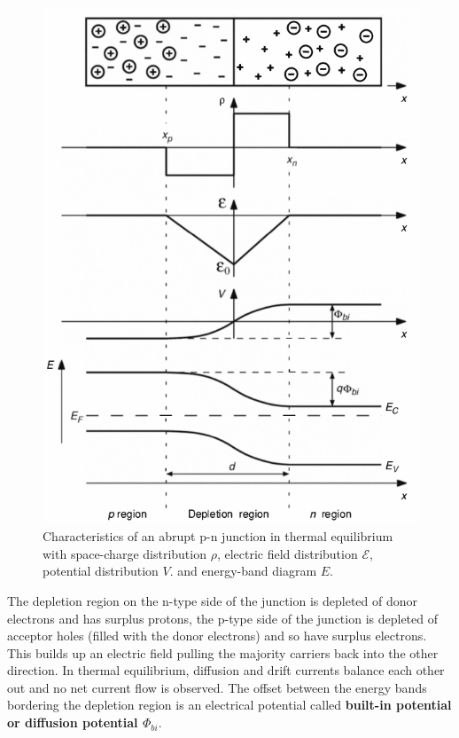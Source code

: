 \documentclass[report]{subfiles}
\begin{document}
\begin{figure}[H]
\centering
\includegraphics[scale=0.4]{pics/depletion_region.png}
\caption{Characteristics of an abrupt p-n junction in thermal equilibrium with space-charge distribution \(\rho\), electric field distribution \(\mathcal{E}\), potential distribution \(V\). and energy-band diagram \(E\).}
\end{figure}

The depletion region on the n-type side of the junction is depleted of donor electrons and has surplus protons, the p-type side of the junction is depleted of acceptor holes (filled with the donor electrons) and so have surplus electrons. This builds up an electric field pulling the majority carriers back into the other direction. In thermal equilibrium, diffusion and drift currents balance each other out and no net current flow is observed. The offset between the energy bands bordering the depletion region is an electrical potential called \textbf{built-in potential or diffusion potential \(\Phi_{bi}\)}.
\end{document}
